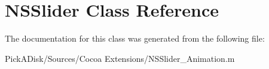 \hypertarget{class_n_s_slider}{
\section{NSSlider Class Reference}
\label{class_n_s_slider}
}


The documentation for this class was generated from the following file:\begin{DoxyCompactItemize}
\item 
PickADisk/Sources/Cocoa Extensions/NSSlider\_\-Animation.m\end{DoxyCompactItemize}

